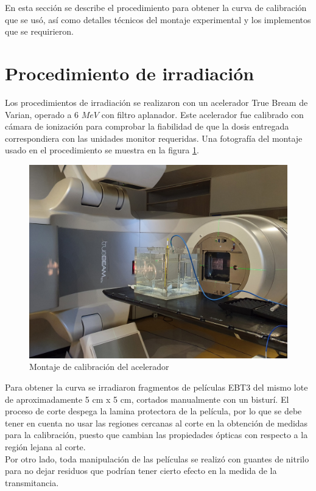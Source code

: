 En esta sección se describe el procedimiento para obtener la curva de calibración que se usó, así como detalles técnicos del montaje experimental y los implementos que se requirieron. 
\section{Procedimiento de irradiación}
Los procedimientos de irradiación se realizaron con un acelerador True Bream de  Varian, operado a 6 $ MeV$ con filtro aplanador. Este acelerador fue calibrado con cámara de ionización para comprobar la fiabilidad de que la dosis entregada correspondiera con las unidades monitor requeridas. Una fotografía del montaje usado en el procedimiento se muestra en la figura \ref{fig:fotoMontaje}.\\

\begin{figure}
	\centering
	\includegraphics[width=0.7\linewidth]{images/20200826_205559.jpg}
	\caption{Montaje de calibración del acelerador}
	\label{fig:fotoMontaje}
\end{figure}
Para obtener la curva se irradiaron fragmentos de películas EBT3 del mismo lote de aproximadamente 5 cm x 5 cm, cortados manualmente con un bisturí. El proceso de corte despega la lamina protectora de la película, por lo que se debe tener en cuenta no usar las regiones cercanas al corte en la obtención de medidas para la calibración, puesto que cambian las propiedades ópticas con respecto a la región lejana al corte. \\

Por otro lado, toda manipulación de las películas se realizó con guantes de nitrilo para no dejar residuos que podrían tener cierto efecto en la medida de la transmitancia. \\

